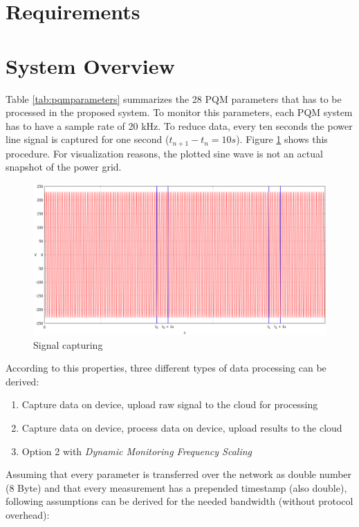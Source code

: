 \section{Requirements}

\section{System Overview}
Table \ref{tab:pqmparameters} summarizes the 28 PQM parameters that has to be processed in the proposed system. To monitor this parameters, each PQM system has to have a sample rate of 20 kHz. To reduce data, every ten seconds the power line signal is captured for one second ($t_{n+1} - t_n = 10s$). Figure \ref{fig:sysdesign} shows this procedure. For visualization reasons, the plotted sine wave is not an actual snapshot of the power grid.

\begin{figure}[h]
	\centering
		\includegraphics[scale=0.45]{graphics/sysdesign.eps}
	\caption{Signal capturing}
	\label{fig:sysdesign}
\end{figure}

According to this properties, three different types of data processing can be derived:

\begin{enumerate}
	\item Capture data on device, upload raw signal to the cloud for processing
	\item Capture data on device, process data on device, upload results to the cloud
	\item Option 2 with \textit{Dynamic Monitoring Frequency Scaling}
\end{enumerate}

Assuming that every parameter is transferred over the network as double number (8 Byte) and that every measurement has a prepended timestamp (also double), following assumptions can be derived for the needed bandwidth (without protocol overhead):

